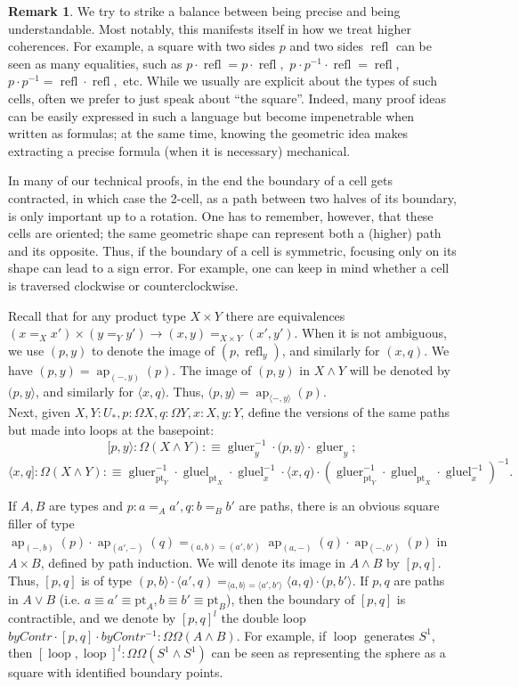 \documentclass{amsart}
\theoremstyle{definition}
\newtheorem{re}[theorem]{Remark}
\newcommand{\ap}{\operatorname{ap}}
\newcommand{\refl}{\operatorname{refl}}
\newcommand{\gluel}{\operatorname{gluel}}
\newcommand{\gluer}{\operatorname{gluer}}
\newcommand{\loo}{\operatorname{loop}}
\newcommand{\bs}[1]{\mathrm{pt}_{#1}}
\newcommand{\lps}[2]{(#1, #2 \rangle}
\newcommand{\rps}[2]{\langle #1, #2 )}
\begin{document}
\begin{re}\label{re:balance}
We try to strike a balance between being precise and being understandable. Most notably, this manifests itself in how we treat higher coherences. For example, a square with two sides $p$ and two sides $\refl$ can be seen as many equalities, such as $p \cdot \refl = p \cdot \refl,$ $p^{} \cdot p^{-1} \cdot \refl = \refl$, $p \cdot p^{-1} = \refl \cdot \refl,$ etc. While we usually are explicit about the types of such cells, often we prefer to just speak about ``the square''. Indeed, many proof ideas can be easily expressed in such a language but become impenetrable when written as formulas; at the same time, knowing the geometric idea makes extracting a precise formula (when it is necessary) mechanical.

In many of our technical proofs, in the end the boundary of a cell gets contracted, in which case the 2-cell, as a path between two halves of its boundary, is only important up to a rotation. One has to remember, however, that these cells are oriented; the same geometric shape can represent both a (higher) path and its opposite. Thus, if the boundary of a cell is symmetric, focusing only on its shape can lead to a sign error. For example, one can keep in mind whether a cell is traversed clockwise or counterclockwise.
\end{re}

Recall that for any product type $X \times Y$ there are equivalences $(x=_X x') \times (y=_Y y') \to (x,y) =_{X \times Y} (x',y')$. When it is not ambiguous, we use $(p, y)$ to denote the image of $(p, \refl_y)$, and similarly for $(x, q)$. We have $(p, y) = \ap_{(-,y)}(p)$. The image of $(p, y)$ in $X \wedge Y$ will be denoted by $\lps{p}{y}$, and similarly for $\rps{x}{q}$. Thus, $\lps{p}{y} = \ap_{\langle -, y \rangle}(p)$.
\\
Next, given $X,Y:U_*, p : \Omega X, q: \Omega Y, x : X, y : Y$, define the versions of the same paths but
made into loops at the basepoint:
    $$[p, y\rangle : \Omega (X \wedge Y) :\equiv \gluer_y^{-1} \cdot \lps{p}y{} \cdot \gluer_y;$$
    $$\langle x, q] : \Omega (X \wedge Y) :\equiv \gluer_{\bs{Y}}^{-1} \cdot \gluel_{\bs{X}} \cdot \gluel_{x}^{-1} \cdot \rps{x}{q} \cdot (\gluer_{\bs{Y}}^{-1} \cdot \gluel_{\bs{X}} \cdot \gluel_{x}^{-1})^{-1}.$$

If $A, B$ are types and $p: a =_A a', q: b =_B b'$ are paths, there is an obvious square filler of type $\ap_{(-, b)}(p) \cdot \ap_{(a', -)}(q) =_{(a,b)=(a',b')} \ap_{(a, -)}(q)  \cdot \ap_{(-, b')}(p)$ in $A \times B$, defined by path induction. We will denote its image in $A \wedge B$ by $[p,q]$. Thus, $[p,q]$ is of type $\lps{p}{b} \cdot \rps{a'}{q} =_{\langle a,b\rangle=\langle  a',b'\rangle} \rps{a}{q} \cdot \lps{p}{b'}$.
If $p,q$ are paths in $A \vee B$ (i.e. $a\equiv a' \equiv \bs{A}, b\equiv b' \equiv \bs{B}$), then the boundary of $[p,q]$ is contractible, and we denote by $[p,q]^l$ the double loop $byContr \cdot [p,q] \cdot byContr^{-1}: \Omega \Omega (A \wedge B)$. For example, if $\loo$ generates $S^1$, then $[\loo, \loo]^l : \Omega \Omega (S^{1} \wedge S^{1})$ can be seen as representing the sphere as a square with identified boundary points.
\end{document}
